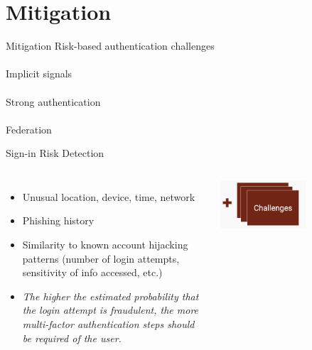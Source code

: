 \documentclass[nobackground,dvipsnames,table]{beamer}
\begin{document}
\section{Mitigation}

\begin{frame}{Mitigation}
    \Large
    Risk-based authentication challenges\\~\\
    Implicit signals\\~\\
    Strong authentication\\~\\
    Federation
\end{frame}

\begin{frame}{Sign-in Risk Detection}
    \begin{columns}
            \small
            \begin{itemize}
                \item Unusual location, device, time, network 
                \item Phishing history
                \item Similarity to known account hijacking patterns (number of login attempts, sensitivity of info accessed, etc.)
                \item \textit{The higher the estimated probability that the login attempt is fraudulent, the more multi-factor authentication steps should be required of the user.}
            \end{itemize}
            \centering
            \includegraphics[width=0.6\textwidth]{challenges}

\end{columns}
\end{frame}
\end{document}
